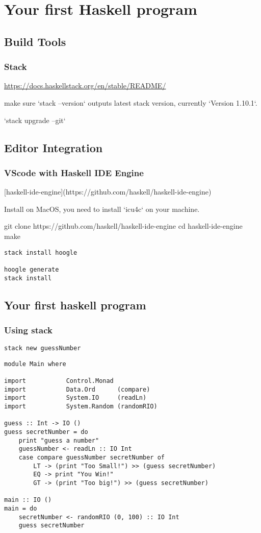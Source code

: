 \chapter{Your first Haskell program}

\section{Build Tools}
\subsection{Stack}

\url{https://docs.haskellstack.org/en/stable/README/}

make sure `stack --version` outputs latest stack version, currently `Version 1.10.1`.

`stack upgrade --git`
\section{Editor Integration}
\subsection{VScode with Haskell IDE Engine}
[haskell-ide-engine](https://github.com/haskell/haskell-ide-engine)

Install on MacOS, you need to install `icu4c` on your machine.

git clone https://github.com/haskell/haskell-ide-engine
cd haskell-ide-engine
make



\begin{verbatim}
stack install hoogle

hoogle generate
stack install
\end{verbatim}


\section{Your first haskell program}
\subsection{Using stack}
\verb|stack new guessNumber|

\begin{verbatim}
module Main where

import           Control.Monad
import           Data.Ord      (compare)
import           System.IO     (readLn)
import           System.Random (randomRIO)

guess :: Int -> IO ()
guess secretNumber = do
    print "guess a number"
    guessNumber <- readLn :: IO Int
    case compare guessNumber secretNumber of
        LT -> (print "Too Small!") >> (guess secretNumber)
        EQ -> print "You Win!"
        GT -> (print "Too big!") >> (guess secretNumber)

main :: IO ()
main = do
    secretNumber <- randomRIO (0, 100) :: IO Int
    guess secretNumber
\end{verbatim}
